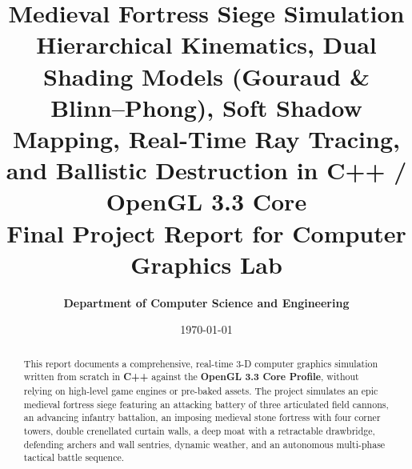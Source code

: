\documentclass[11pt,a4paper]{article}
\title{\vspace{-12mm}
       \Huge\textbf{\textcolor{primary}{Medieval Fortress Siege Simulation}}\\[3mm]
       \LARGE\textbf{Hierarchical Kinematics, Dual Shading Models (Gouraud \& Blinn--Phong), Soft Shadow Mapping, Real-Time Ray Tracing, and Ballistic Destruction in C++ / OpenGL 3.3 Core}\\[4mm]
       \large Final Project Report for Computer Graphics Lab}
\author{\textbf{Department of Computer Science and Engineering}}
\date{\today}
\begin{document}
\maketitle
\thispagestyle{fancy}

\begin{abstract}
\noindent
This report documents a comprehensive, real-time 3-D computer graphics simulation written from scratch in \textbf{C++} against the \textbf{OpenGL 3.3 Core Profile}, without relying on high-level game engines or pre-baked assets. The project simulates an epic medieval fortress siege featuring an attacking battery of three articulated field cannons, an advancing infantry battalion, an imposing medieval stone fortress with four corner towers, double crenellated curtain walls, a deep moat with a retractable drawbridge, defending archers and wall sentries, dynamic weather, and an autonomous multi-phase tactical battle sequence.


\end{abstract}
\end{document}
